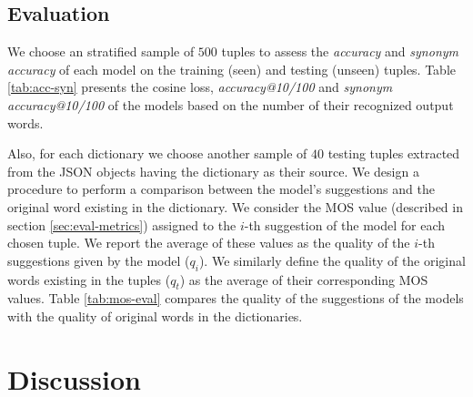 \documentclass{article}
\begin{document}
\subsection{Evaluation}
We choose an stratified sample of $500$ tuples to assess the \textit{accuracy} and \textit{synonym accuracy} of each model on the training (seen) and testing (unseen) tuples. Table \ref{tab:acc-syn} presents the cosine loss, \textit{accuracy@10/100} and \textit{synonym accuracy@10/100} of the models based on the number of their recognized output words.


Also, for each dictionary we choose another sample of $40$ testing tuples extracted from the JSON objects having the dictionary as their source. We design a procedure to perform a comparison between the model's suggestions and the original word existing in the dictionary. We consider the MOS value (described in section \ref{sec:eval-metrics}) assigned to the $i$-th suggestion of the model for each chosen tuple. We report the average of these values as the quality of the $i$-th suggestions given by the model ($q_i$). We similarly define the quality of the original words existing in the tuples ($q_t$) as the average of their corresponding MOS values. Table \ref{tab:mos-eval} compares the quality of the suggestions of the models with the quality of original words in the dictionaries.

\section{Discussion \label{sec:discussion}}
\end{document}
